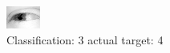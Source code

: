 \begin{figure}[h!]
\begin{center}
\includegraphics[width=0.60\columnwidth]{figures/ID2444_class_3_target_4.png}
\end{center}
\caption{ Classification: 3 actual target: 4}
\label{fig:ID2444_class_3_target_4}
\end{figure}
